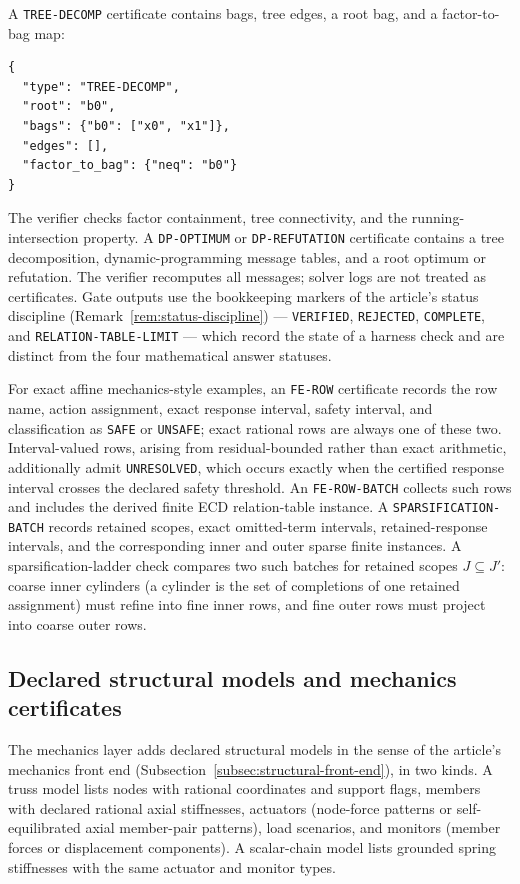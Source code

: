 A \texttt{TREE-DECOMP} certificate contains bags, tree edges, a root bag, and a
factor-to-bag map:
\begin{verbatim}
{
  "type": "TREE-DECOMP",
  "root": "b0",
  "bags": {"b0": ["x0", "x1"]},
  "edges": [],
  "factor_to_bag": {"neq": "b0"}
}
\end{verbatim}
The verifier checks factor containment, tree connectivity, and the
running-intersection property. A \texttt{DP-OPTIMUM} or \texttt{DP-REFUTATION}
certificate contains a tree decomposition, dynamic-programming message tables,
and a root optimum or refutation. The verifier recomputes all messages; solver
logs are not treated as certificates. Gate outputs use the bookkeeping markers
of the article's status discipline (Remark~\ref{rem:status-discipline}) ---
\texttt{VERIFIED}, \texttt{REJECTED}, \texttt{COMPLETE}, and
\texttt{RELATION-TABLE-LIMIT} --- which record the
state of a harness check and are distinct from the four mathematical answer
statuses.

For exact affine mechanics-style examples, an \texttt{FE-ROW} certificate records
the row name, action assignment, exact response interval, safety interval, and
classification as \texttt{SAFE} or \texttt{UNSAFE}; exact rational rows are
always one of these two. Interval-valued rows, arising from residual-bounded
rather than exact arithmetic, additionally admit \texttt{UNRESOLVED}, which
occurs exactly when the certified response interval crosses the declared safety
threshold. An \texttt{FE-ROW-BATCH}
collects such rows and includes the derived finite ECD relation-table instance.
A \texttt{SPARSIFICATION-BATCH} records retained scopes, exact omitted-term
intervals, retained-response intervals, and the corresponding inner and outer
sparse finite instances. A sparsification-ladder check compares two such batches
for retained scopes $J\subseteq J'$: coarse inner cylinders (a cylinder is
the set of completions of one retained assignment) must refine into fine
inner rows, and fine outer rows must project into coarse outer rows.

\subsection{Declared structural models and mechanics certificates}

The mechanics layer adds declared structural models in the sense of the
article's mechanics front end (Subsection~\ref{subsec:structural-front-end}),
in two kinds. A truss model lists nodes with rational coordinates and support
flags, members with declared rational axial stiffnesses, actuators (node-force
patterns or self-equilibrated axial member-pair patterns), load scenarios, and
monitors (member forces or displacement components). A scalar-chain model lists
grounded spring stiffnesses with the same actuator and monitor types.

